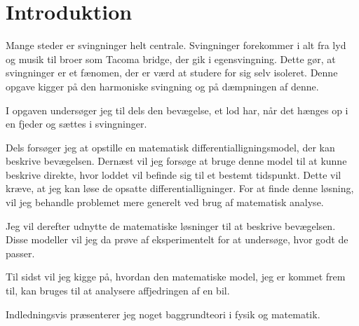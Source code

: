 \chapter{Introduktion}
Mange steder er svingninger helt centrale. 
Svingninger forekommer i alt fra lyd og musik til broer som Tacoma bridge, der gik i egensvingning. 
Dette gør, at svingninger er et fænomen, der er værd at studere for sig selv isoleret. 
Denne opgave kigger på den harmoniske svingning og på dæmpningen af denne.

I opgaven undersøger jeg til dels den bevægelse, et lod har, når det hænges op i en fjeder og sættes i svingninger.

Dels forsøger jeg at opstille en matematisk differentialligningsmodel, der kan beskrive bevægelsen.
Dernæst vil jeg forsøge at bruge denne model til at kunne beskrive direkte, hvor loddet vil befinde sig til et bestemt tidspunkt. 
Dette vil kræve, at jeg kan løse de opsatte differentialligninger. 
For at finde denne løsning, vil jeg behandle problemet mere generelt ved brug af matematisk analyse. 

Jeg vil derefter udnytte de matematiske løsninger til at beskrive bevægelsen.
Disse modeller vil jeg da prøve af eksperimentelt for at undersøge, hvor godt de passer. 

Til sidst vil jeg kigge på, hvordan den matematiske model, jeg er kommet frem til, kan bruges til at analysere affjedringen af en bil. 
\vspace{1cm}

Indledningsvis præsenterer jeg noget baggrundteori i fysik og matematik. 


